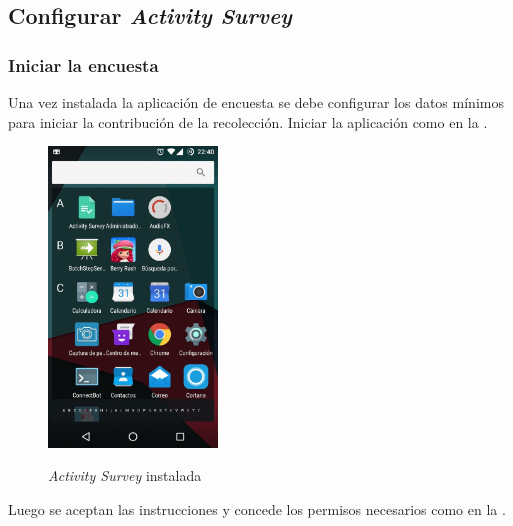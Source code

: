 {\subsection{Configurar \emph{Activity Survey}}
\label{config:configurar-activity-survey}\label{config:har-config}\label{config::doc}

\subsubsection{Iniciar la encuesta}
\label{config:iniciar-la-encuesta}
Una vez instalada la aplicación de encuesta se debe configurar los datos mínimos para iniciar la contribución de la recolección. Iniciar la aplicación como en la .
\begin{figure}[!h]
\centering
    {\includegraphics[width=0.4\textwidth]{anexos/graphics/app_inst.jpg}}
\caption{\emph{Activity Survey} instalada}\label{config:id1}\end{figure}

Luego se aceptan las instrucciones y concede los permisos necesarios como en la .

}
